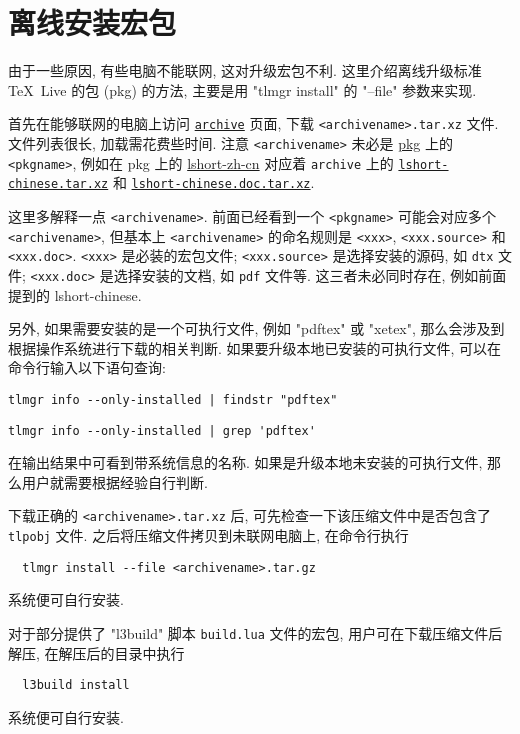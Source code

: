 
\chapter{离线安装宏包}

由于一些原因,
有些电脑不能联网,
这对升级宏包不利.
这里介绍离线升级标准 \TeX~Live 的包 (pkg) 的方法,
主要是用 "tlmgr install" 的 "--file" 参数来实现.

首先在能够联网的电脑上访问
\href{https://ctan.org/tex-archive/systems/texlive/tlnet/archive}{\texttt{archive}}
页面, 下载 \texttt{<archivename>.tar.xz} 文件.
文件列表很长, 加载需花费些时间.
注意 \texttt{<archivename>} 未必是
\href{https://ctan.org/pkg/}{\textsf{pkg}} 上的 \texttt{<pkgname>},
例如在 \textsf{pkg} 上的
\href{https://ctan.org/pkg/lshort-zh-cn}{\textsf{lshort-zh-cn}}
对应着 \texttt{archive} 上的
\href{http://mirrors.ctan.org/systems/texlive/tlnet/archive/lshort-chinese.tar.xz}{\texttt{lshort-chinese.tar.xz}}
和
\href{http://mirrors.ctan.org/systems/texlive/tlnet/archive/lshort-chinese.doc.tar.xz}{\texttt{lshort-chinese.doc.tar.xz}}.

这里多解释一点 \texttt{<archivename>}.
前面已经看到一个 \texttt{<pkgname>} 可能会对应多个 \texttt{<archivename>},
但基本上 \texttt{<archivename>} 的命名规则是 \texttt{<xxx>},
\texttt{<xxx.source>} 和 \texttt{<xxx.doc>}.
\texttt{<xxx>} 是必装的宏包文件;
\texttt{<xxx.source>} 是选择安装的源码, 如 \texttt{dtx} 文件;
\texttt{<xxx.doc>} 是选择安装的文档, 如 \texttt{pdf} 文件等.
这三者未必同时存在, 例如前面提到的 \textsf{lshort-chinese}.

另外, 如果需要安装的是一个可执行文件, 例如 "pdftex" 或 "xetex",
那么会涉及到根据操作系统进行下载的相关判断.
如果要升级本地已安装的可执行文件, 可以在命令行输入以下语句查询:
\begin{lstlisting}[title = \small\sffamily Windows 系统]
  tlmgr info --only-installed | findstr "pdftex"
\end{lstlisting}
\begin{lstlisting}[title = \small\sffamily Ubuntu 和 macOS]
  tlmgr info --only-installed | grep 'pdftex'
\end{lstlisting}
在输出结果中可看到带系统信息的名称.
如果是升级本地未安装的可执行文件,
那么用户就需要根据经验自行判断.

下载正确的 \texttt{<archivename>.tar.xz} 后,
可先检查一下该压缩文件中是否包含了 \texttt{tlpobj} 文件.
之后将压缩文件拷贝到未联网电脑上,
在命令行执行
\begin{lstlisting} 
  tlmgr install --file <archivename>.tar.gz 
\end{lstlisting}
系统便可自行安装.

对于部分提供了 "l3build" 脚本 \texttt{build.lua} 文件的宏包,
用户可在下载压缩文件后解压, 在解压后的目录中执行
\begin{lstlisting} 
  l3build install
\end{lstlisting}
系统便可自行安装.
